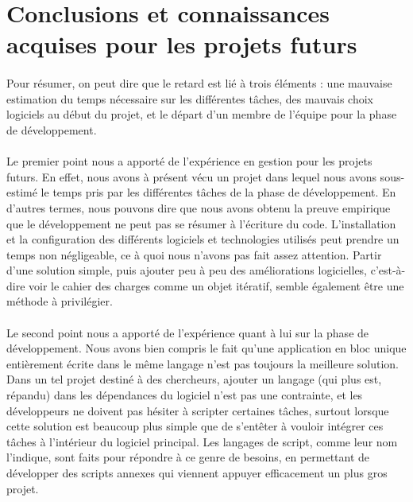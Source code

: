 


\section{Conclusions et connaissances acquises pour les projets futurs}

\paragraph{}
Pour résumer, on peut dire que le retard est lié à trois éléments : une mauvaise estimation du temps nécessaire sur les différentes tâches, des mauvais choix logiciels au début du projet, et le départ d'un membre de l'équipe pour la phase de développement.

\paragraph{}
Le premier point nous a apporté de l'expérience en gestion pour les projets futurs. En effet, nous avons à présent vécu un projet dans lequel nous avons sous-estimé le temps pris par les différentes tâches de la phase de développement. En d'autres termes, nous pouvons dire que nous avons obtenu la preuve empirique que le développement ne peut pas se résumer à l'écriture du code. L'installation et la configuration des différents logiciels et technologies utilisés peut prendre un temps non négligeable, ce à quoi nous n'avons pas fait assez attention. Partir d'une solution simple, puis ajouter peu à peu des améliorations logicielles, c'est-à-dire voir le cahier des charges comme un objet itératif, semble également être une méthode à privilégier.

\paragraph{}
Le second point nous a apporté de l'expérience quant à lui sur la phase de développement. Nous avons bien compris le fait qu'une application en bloc unique entièrement écrite dans le même langage n'est pas toujours la meilleure solution. Dans un tel projet destiné à des chercheurs, ajouter un langage (qui plus est, répandu) dans les dépendances du logiciel n'est pas une contrainte, et les développeurs ne doivent pas hésiter à scripter certaines tâches, surtout lorsque cette solution est beaucoup plus simple que de s'entêter à vouloir intégrer ces tâches à l'intérieur du logiciel principal. Les langages de script, comme leur nom l'indique, sont faits pour répondre à ce genre de besoins, en permettant de développer des scripts annexes qui viennent appuyer efficacement un plus gros projet.

